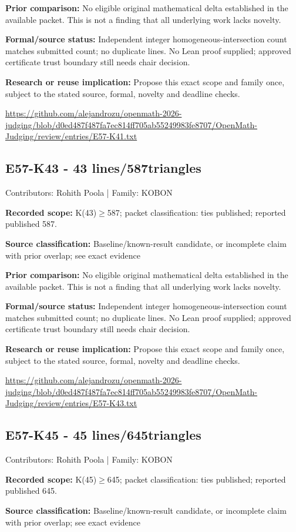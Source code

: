 \documentclass[11pt,a4paper]{article}
\begin{document}
\textbf{Prior comparison:} No eligible original mathematical delta established in the available packet. This is not a finding that all underlying work lacks novelty.

\textbf{Formal/source status:} Independent integer homogeneous-intersection count matches submitted count; no duplicate lines. No Lean proof supplied; approved certificate trust boundary still needs chair decision.

\textbf{Research or reuse implication:} Propose this exact scope and family once, subject to the stated source, formal, novelty and deadline checks.

{\small \url{https://github.com/alejandrozu/openmath-2026-judging/blob/d0ed487f487fa7ec814ff705ab55249983fe8707/OpenMath-Judging/review/entries/E57-K41.txt}\par}

\begin{samepage}
\subsection{E57-K43  -  43 lines/587triangles}
{\small Contributors: Rohith Poola | Family: KOBON\par}

\textbf{Recorded scope:} K(43)\ensuremath{\geq}587; packet classification: ties published; reported published 587.

\end{samepage}
\textbf{Source classification:} Baseline/known-result candidate, or incomplete claim with prior overlap; see exact evidence

\textbf{Prior comparison:} No eligible original mathematical delta established in the available packet. This is not a finding that all underlying work lacks novelty.

\textbf{Formal/source status:} Independent integer homogeneous-intersection count matches submitted count; no duplicate lines. No Lean proof supplied; approved certificate trust boundary still needs chair decision.

\textbf{Research or reuse implication:} Propose this exact scope and family once, subject to the stated source, formal, novelty and deadline checks.

{\small \url{https://github.com/alejandrozu/openmath-2026-judging/blob/d0ed487f487fa7ec814ff705ab55249983fe8707/OpenMath-Judging/review/entries/E57-K43.txt}\par}

\begin{samepage}
\subsection{E57-K45  -  45 lines/645triangles}
{\small Contributors: Rohith Poola | Family: KOBON\par}

\textbf{Recorded scope:} K(45)\ensuremath{\geq}645; packet classification: ties published; reported published 645.

\end{samepage}
\textbf{Source classification:} Baseline/known-result candidate, or incomplete claim with prior overlap; see exact evidence
\end{document}
